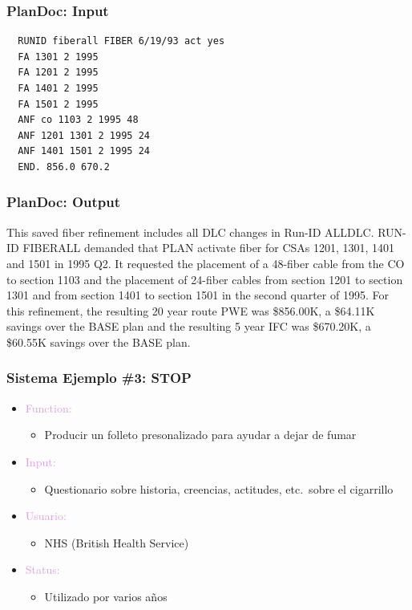 \documentclass[compress,color=usenames]{beamer}
\newcommand{\mH}[1]{\textcolor{Plum}{#1}}
\begin{document}
\begin{frame}[fragile]
\frametitle{PlanDoc: Input}

\begin{verbatim}
  RUNID fiberall FIBER 6/19/93 act yes
  FA 1301 2 1995
  FA 1201 2 1995
  FA 1401 2 1995
  FA 1501 2 1995
  ANF co 1103 2 1995 48
  ANF 1201 1301 2 1995 24
  ANF 1401 1501 2 1995 24
  END. 856.0 670.2
\end{verbatim}

\end{frame}

\begin{frame}
\frametitle{PlanDoc: Output}

This saved fiber refinement includes all DLC changes in Run-ID ALLDLC. RUN-ID FIBERALL demanded that PLAN activate fiber for CSAs 1201, 1301, 1401 and 1501 in 1995 Q2. It requested the placement of a 48-fiber cable from the CO to section 1103 and the placement of 24-fiber cables from section 1201 to section 1301 and from section 1401 to section 1501 in the second quarter of 1995. For this refinement, the resulting 20 year route PWE was \$856.00K, a \$64.11K savings over the BASE plan and the resulting 5 year IFC was \$670.20K, a \$60.55K savings over the BASE plan.
\end{frame}

\begin{frame}
\frametitle{Sistema Ejemplo \#3: STOP}

\begin{itemize}
\item \mH{Function: }
\begin{itemize}
\item Producir un folleto presonalizado para ayudar a dejar de fumar 
\end{itemize}
\item \mH{Input: }
\begin{itemize}
\item Questionario sobre historia, creencias, actitudes, etc.\ sobre el cigarrillo
\end{itemize}
\item \mH{Usuario: }
\begin{itemize}
\item NHS (British Health Service)
\end{itemize}
\item \mH{Status: }
\begin{itemize}
\item Utilizado por varios a\~nos
\end{itemize}
\end{itemize}

\end{frame}
\end{document}

